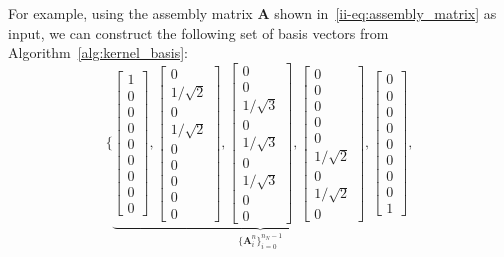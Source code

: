 For example, using the assembly matrix $\mathbf{A}$ shown in~\eqref{ii-eq:assembly_matrix} as input, we can construct the following set of basis vectors from Algorithm~\ref{alg:kernel_basis}:
\begin{equation}
	\Biggl\{
	\underbrace{\begin{bmatrix} 1\\ 0\\ 0\\ 0\\ 0\\ 0\\ 0\\ 0\\ 0 \end{bmatrix},
		\begin{bmatrix} 0\\ 1/\sqrt{2}\\ 0\\ 1/\sqrt{2}\\ 0\\ 0\\ 0\\ 0\\ 0 \end{bmatrix},
		\begin{bmatrix} 0\\ 0\\ 1/\sqrt{3}\\ 0\\ 1/\sqrt{3}\\ 0\\ 1/\sqrt{3}\\ 0\\ 0 \end{bmatrix},
		\begin{bmatrix} 0\\ 0\\ 0\\ 0\\ 0\\ 1/\sqrt{2}\\ 0\\ 1/\sqrt{2}\\ 0 \end{bmatrix},
		\begin{bmatrix} 0\\ 0\\ 0\\ 0\\ 0\\ 0\\ 0\\ 0\\ 1 \end{bmatrix}}_{\{\mathbf{A}^n_i\}_{i=0}^{n_N-1}},

\end{equation}
